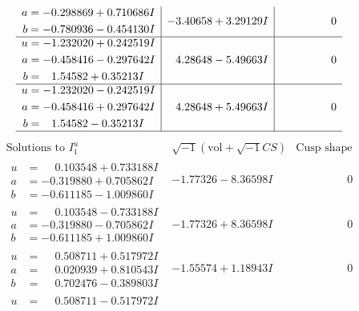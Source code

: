 \documentclass[1p]{elsarticle_modified}
\theoremstyle{definition}
\newcommand{\I}{\sqrt{-1}}
\begin{document}
$$\begin{array}{c|c|c}
\begin{aligned}
a &= -0.298869 + 0.710686 I \\
b &= -0.780936 - 0.454130 I\end{aligned}
 & -3.40658 + 3.29129 I & \phantom{-0.000000 } 0 \\ \hline\begin{aligned}
u &= -1.232020 + 0.242519 I \\
a &= -0.458416 - 0.297642 I \\
b &= \phantom{-}1.54582 + 0.35213 I\end{aligned}
 & \phantom{-}4.28648 - 5.49663 I & \phantom{-0.000000 } 0 \\ \hline\begin{aligned}
u &= -1.232020 - 0.242519 I \\
a &= -0.458416 + 0.297642 I \\
b &= \phantom{-}1.54582 - 0.35213 I\end{aligned}
 & \phantom{-}4.28648 + 5.49663 I & \phantom{-0.000000 } 0\\
 \hline 
 \end{array}$$\newpage$$\begin{array}{c|c|c}  
\text{Solutions to }I^u_{1}& \I (\text{vol} + \sqrt{-1}CS) & \text{Cusp shape}\\
 \hline 
\begin{aligned}
u &= \phantom{-}0.103548 + 0.733188 I \\
a &= -0.319880 + 0.705862 I \\
b &= -0.611185 - 1.009860 I\end{aligned}
 & -1.77326 - 8.36598 I & \phantom{-0.000000 } 0 \\ \hline\begin{aligned}
u &= \phantom{-}0.103548 - 0.733188 I \\
a &= -0.319880 - 0.705862 I \\
b &= -0.611185 + 1.009860 I\end{aligned}
 & -1.77326 + 8.36598 I & \phantom{-0.000000 } 0 \\ \hline\begin{aligned}
u &= \phantom{-}0.508711 + 0.517972 I \\
a &= \phantom{-}0.020939 + 0.810543 I \\
b &= \phantom{-}0.702476 - 0.389803 I\end{aligned}
 & -1.55574 + 1.18943 I & \phantom{-0.000000 } 0 \\ \hline\begin{aligned}
u &= \phantom{-}0.508711 - 0.517972 I \\

\end{aligned}
\end{array}$$
\end{document}
